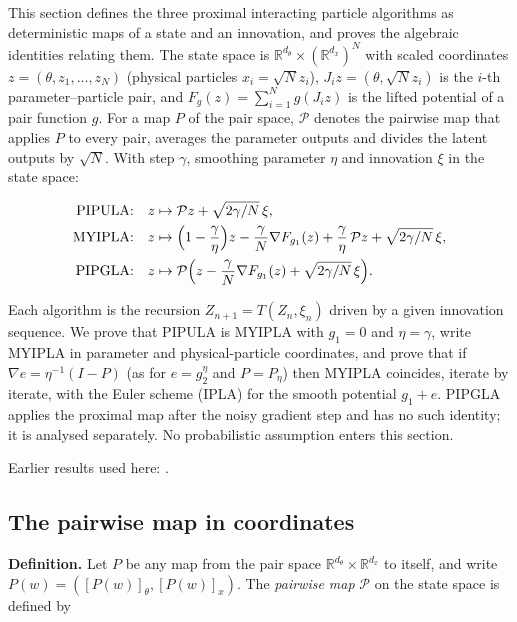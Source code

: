 \documentclass[11pt,a4paper]{report}
\begin{document}
This section defines the three proximal interacting particle algorithms as deterministic maps of a state and an innovation, and proves the algebraic identities relating them. The state space is \(\mathbb R^{d_\theta}\times(\mathbb R^{d_x})^N\) with scaled coordinates \(z=(\theta,z_1,\dots,z_N)\) (physical particles \(x_i=\sqrt Nz_i\)), \(J_iz=(\theta,\sqrt Nz_i)\) is the \(i\)-th parameter–particle pair, and \(F_g(z)=\sum_{i=1}^Ng(J_iz)\) is the lifted potential of a pair function \(g\). For a map \(P\) of the pair space, \(\mathcal P\) denotes the pairwise map that applies \(P\) to every pair, averages the parameter outputs and divides the latent outputs by \(\sqrt N\). With step \(\gamma\), smoothing parameter \(\eta\) and innovation \(\xi\) in the state space:


\[\begin{aligned}
\text{PIPULA:}\quad&z\mapsto\mathcal Pz+\sqrt{2\gamma/N}\,\xi,\\
\text{MYIPLA:}\quad&z\mapsto\Bigl(1-\frac\gamma\eta\Bigr)z-\frac\gamma N\nabla F_{g_1}(z)+\frac\gamma\eta\,\mathcal Pz+\sqrt{2\gamma/N}\,\xi,\\
\text{PIPGLA:}\quad&z\mapsto\mathcal P\Bigl(z-\frac\gamma N\nabla F_{g_1}(z)+\sqrt{2\gamma/N}\,\xi\Bigr).
\end{aligned}\]


Each algorithm is the recursion \(Z_{n+1}=T(Z_n,\xi_n)\) driven by a given innovation sequence. We prove that PIPULA is MYIPLA with \(g_1=0\) and \(\eta=\gamma\), write MYIPLA in parameter and physical-particle coordinates, and prove that if \(\nabla e=\eta^{-1}(I-P)\) (as for \(e=g_2^\eta\) and \(P=P_\eta\)) then MYIPLA coincides, iterate by iterate, with the Euler scheme (IPLA) for the smooth potential \(g_1+e\). PIPGLA applies the proximal map after the noisy gradient step and has no such identity; it is analysed separately. No probabilistic assumption enters this section.



Earlier results used here: \cite[Section~3.4]{LangevinLean2026IPLA}.
\subsection{\texorpdfstring{The pairwise map in coordinates}{The pairwise map in coordinates}}
\label{report-step-ProximalLangevin-Algorithms-lean-1}


\textbf{Definition.} Let \(P\) be any map from the pair space \(\mathbb R^{d_\theta}\times\mathbb R^{d_x}\) to itself, and write \(P(w)=([P(w)]_\theta,[P(w)]_x)\). The \emph{pairwise map} \(\mathcal P\) on the state space is defined by
\end{document}
